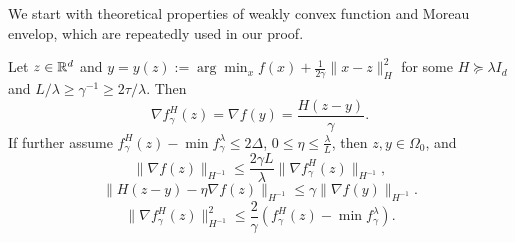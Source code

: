 \documentclass{article} %
\numberwithin{equation}{section}
\begin{document}
    We start with theoretical properties of weakly convex function and Moreau envelop, which are repeatedly used in our proof.

\begin{lemma}\label{lem:moreau_env}
    Let $z\in \mathbb{R}^d$ and $y=y(z):=\arg\min_x f(x)+\frac{1}{2\gamma}\|x-z\|_H^2$ for some $H\succeq 
    \lambda I_d$ and $L/\lambda \geq \gamma^{-1}\geq 2\tau/\lambda$. Then
    \begin{equation}\label{eq:24}
        \nabla f_\gamma^H (z) = \nabla f(y) = \frac{H(z-y)}{\gamma}.
    \end{equation}
    If further assume $f_\gamma^H(z)-\min f_\gamma^\lambda\leq 2\Delta$, $0\leq\eta\leq \frac{\lambda}{L}$, then $z,y\in \Omega_0$, and 
    \begin{equation}
        \|\nabla f(z)\|_{H^{-1}}\leq \frac{2\gamma L}{\lambda}\|\nabla f_\gamma^H(z)\|_{H^{-1}},
    \end{equation}
    \begin{equation}\label{eq:moreau_env_2}
        \|H(z-y)-\eta \nabla f(z)\|_{H^{-1}}\leq \gamma\|\nabla f(y)\|_{H^{-1}}.
    \end{equation}
    \begin{equation}
        \|\nabla f_\gamma^H(z)\|_{H^{-1}}^2\leq \frac{2}{\gamma}(f_\gamma^H(z)-\min f_\gamma^\lambda).
    \end{equation}
\end{lemma}
\end{document}
